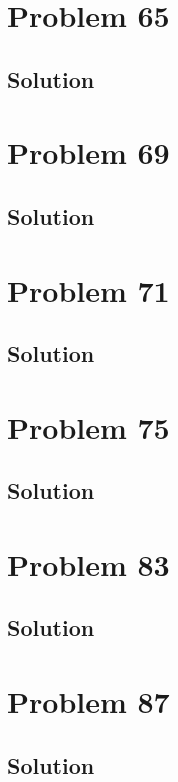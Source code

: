 \documentclass[12pt]{article}
\begin{document}
    \section{Problem 65}

        \subsection{Solution}

    \pagebreak
    \section{Problem 69}

        \subsection{Solution}

    \pagebreak
    \section{Problem 71}

        \subsection{Solution}

    \pagebreak
    \section{Problem 75}

        \subsection{Solution}

    \pagebreak
    \section{Problem 83}

        \subsection{Solution}

    \pagebreak
    \section{Problem 87}

        \subsection{Solution}
\end{document}
